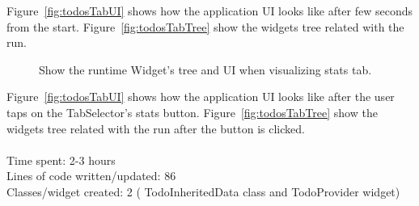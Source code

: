 Figure~\ref{fig:todosTabUI} shows how the application UI looks like after few seconds from the start. Figure~\ref{fig:todosTabTree} show the widgets tree related with the run.
\begin{figure}[H]
    \centering
    \quad
    \caption{Show the runtime Widget's tree and UI when visualizing stats tab.}
    \label{fig:stats_tab}
\end{figure}
Figure~\ref{fig:todosTabUI} shows how the application UI looks like after the user taps on the TabSelector's stats button. Figure~\ref{fig:todosTabTree} show the widgets tree related with the run after the button is clicked.\\
\\
Time spent: 2-3 hours\\
Lines of code written/updated: 86\\
Classes/widget created: 2 ( TodoInheritedData class and TodoProvider widget)\\



